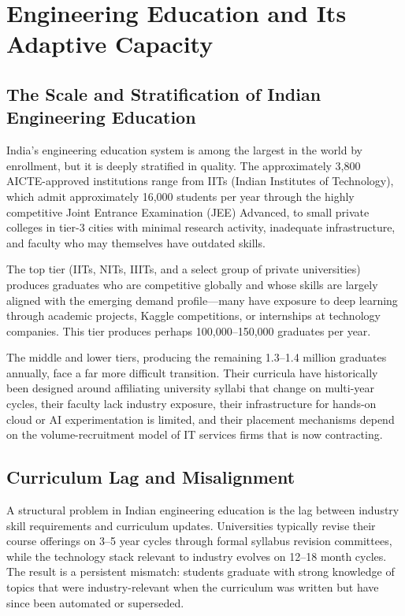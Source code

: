 \documentclass[conference]{IEEEtran}
\begin{document}
\section{Engineering Education and Its Adaptive Capacity}
\label{sec:education}

\subsection{The Scale and Stratification of Indian Engineering Education}

India's engineering education system is among the largest in the world by enrollment, but it is deeply stratified in quality. The approximately 3,800 AICTE-approved institutions range from IITs (Indian Institutes of Technology), which admit approximately 16,000 students per year through the highly competitive Joint Entrance Examination (JEE) Advanced, to small private colleges in tier-3 cities with minimal research activity, inadequate infrastructure, and faculty who may themselves have outdated skills.

The top tier (IITs, NITs, IIITs, and a select group of private universities) produces graduates who are competitive globally and whose skills are largely aligned with the emerging demand profile---many have exposure to deep learning through academic projects, Kaggle competitions, or internships at technology companies. This tier produces perhaps 100,000--150,000 graduates per year.

The middle and lower tiers, producing the remaining 1.3--1.4 million graduates annually, face a far more difficult transition. Their curricula have historically been designed around affiliating university syllabi that change on multi-year cycles, their faculty lack industry exposure, their infrastructure for hands-on cloud or AI experimentation is limited, and their placement mechanisms depend on the volume-recruitment model of IT services firms that is now contracting.

\subsection{Curriculum Lag and Misalignment}

A structural problem in Indian engineering education is the lag between industry skill requirements and curriculum updates. Universities typically revise their course offerings on 3--5 year cycles through formal syllabus revision committees, while the technology stack relevant to industry evolves on 12--18 month cycles. The result is a persistent mismatch: students graduate with strong knowledge of topics that were industry-relevant when the curriculum was written but have since been automated or superseded.
\end{document}
